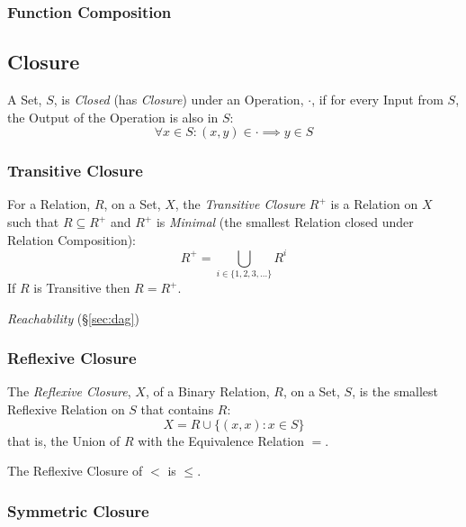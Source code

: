 \subsubsection{Function Composition}\label{sec:function_composition}



\subsection{Closure}\label{sec:set_closure}

A Set, $S$, is \emph{Closed} (has \emph{Closure}) under an Operation,
$\cdot$, if for every Input from $S$, the Output of the Operation is
also in $S$:
\[
    \forall x \in S : (x,y) \in \cdot \implies y \in S
\]

\subsubsection{Transitive Closure}\label{sec:transitive_closure}

For a Relation, $R$, on a Set, $X$, the \emph{Transitive Closure}
$R^+$ is a Relation on $X$ such that $R \subseteq R^+$ and $R^+$ is
\emph{Minimal} (the smallest Relation closed under Relation
Composition):
\[
    R^+ = \bigcup_{i \in \{1,2,3,...\}} R^i
\]
If $R$ is Transitive then $R = R^+$.

\emph{Reachability} (\S\ref{sec:dag})



\subsubsection{Reflexive Closure}\label{sec:reflexive_closure}

The \emph{Reflexive Closure}, $X$, of a Binary Relation, $R$, on a
Set, $S$, is the smallest Reflexive Relation on $S$ that contains $R$:
\[
    X = R \cup \{(x,x) : x \in S\}
\]
that is, the Union of $R$ with the Equivalence Relation $=$.

The Reflexive Closure of $<$ is $\leq$.



\subsubsection{Symmetric Closure}\label{sec:symmetric_closure}

